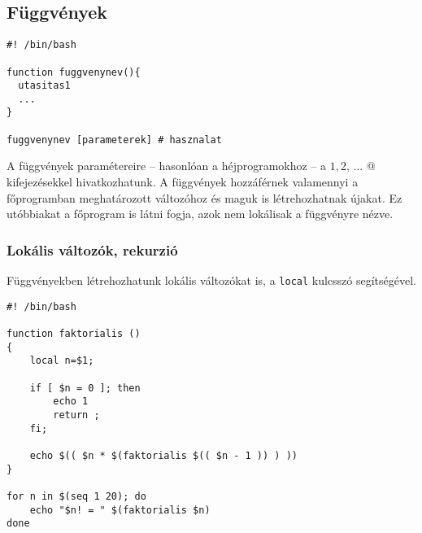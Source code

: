 

\subsection{Függvények}

\begin{lstlisting}
#! /bin/bash

function fuggvenynev(){
  utasitas1
  ...
}

fuggvenynev [parameterek] # hasznalat
\end{lstlisting}

A függvények paramétereire -- hasonlóan a héjprogramokhoz -- a \verb@$1, $2, ... @ kifejezésekkel hivat\-koz\-ha\-tunk.
A függvények hozzáférnek valamennyi a főprogramban meghatározott változóhoz és maguk is lét\-re\-hoz\-hat\-nak újakat. 
Ez utóbbiakat a főprogram is látni fogja, azok nem lokálisak a függvényre nézve. 


\subsubsection*{Lokális változók, rekurzió}
Függvényekben létrehozhatunk lokális változókat is, a \texttt{local} kulcsszó segítségével.


%
\begin{lstlisting}
#! /bin/bash

function faktorialis ()
{
    local n=$1;

    if [ $n = 0 ]; then
        echo 1
        return ;
    fi;

    echo $(( $n * $(faktorialis $(( $n - 1 )) ) ))
}

for n in $(seq 1 20); do
    echo "$n! = " $(faktorialis $n)
done
\end{lstlisting}


